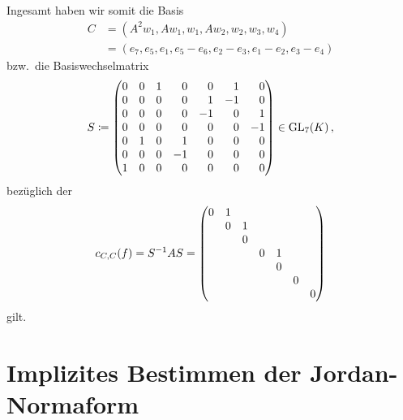 \documentclass[a4paper,10pt,numbers = noenddot]{scrartcl}
\begin{document}
\begin{example}
  Ingesamt haben wir somit die Basis
  \begin{align*}
        C
    &=  (A^2 w_1, A w_1, w_1, A w_2, w_2, w_3, w_4) \\
    &=  (e_7, e_5, e_1, e_5 - e_6, e_2 - e_3, e_1 - e_2, e_3 - e_4)
  \end{align*}
  bzw.\ die Basiswechselmatrix
  \[
              S
    \defined \begin{pmatrix*}[r]
                0 & 0 & 1 &  0  &  0  &  1  &  0  \\
                0 & 0 & 0 &  0  &  1  & -1  &  0  \\
                0 & 0 & 0 &  0  & -1  &  0  &  1  \\
                0 & 0 & 0 &  0  &  0  &  0  & -1  \\
                0 & 1 & 0 &  1  &  0  &  0  &  0  \\
                0 & 0 & 0 & -1  &  0  &  0  &  0  \\
                1 & 0 & 0 &  0  &  0  &  0  &  0
              \end{pmatrix*}
    \in       \GL{7}{K} \,,
  \]
  bezüglich der
  \[
      \repmatrixendo{f}{C}
    = S^{-1} A S
    = \begin{pmatrix}
        0 & 1 &   &   &   &   &   \\
          & 0 & 1 &   &   &   &   \\
          &   & 0 &   &   &   &   \\
          &   &   & 0 & 1 &   &   \\
          &   &   &   & 0 &   &   \\
          &   &   &   &   & 0 &   \\
          &   &   &   &   &   & 0
      \end{pmatrix}
  \]
  gilt.
\end{example}





\section*{Implizites Bestimmen der Jordan-Normaform}
\end{document}
